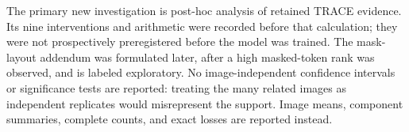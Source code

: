 The primary new investigation is post-hoc analysis of retained TRACE evidence. Its nine interventions and arithmetic were recorded before that calculation; they were not prospectively preregistered before the model was trained. The mask-layout addendum was formulated later, after a high masked-token rank was observed, and is labeled exploratory. No image-independent confidence intervals or significance tests are reported: treating the many related images as independent replicates would misrepresent the support. Image means, component summaries, complete counts, and exact losses are reported instead.

